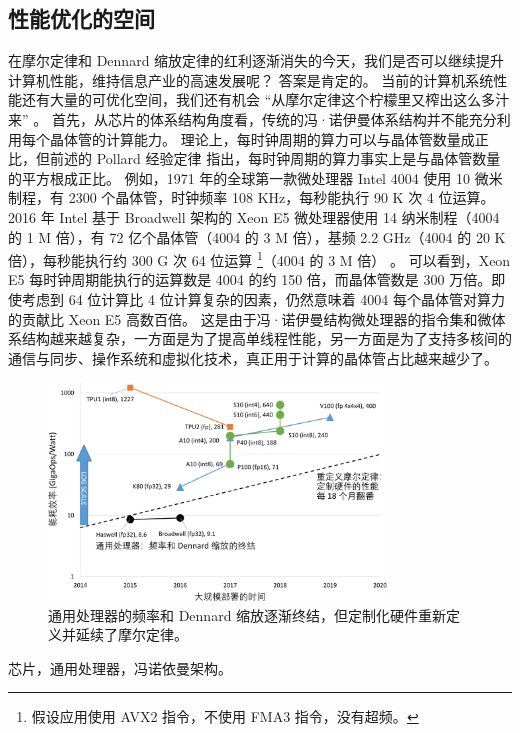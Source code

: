 \subsection{性能优化的空间}

在摩尔定律和 Dennard 缩放定律的红利逐渐消失的今天，我们是否可以继续提升计算机性能，维持信息产业的高速发展呢？
答案是肯定的。
当前的计算机系统性能还有大量的可优化空间，我们还有机会 ``从摩尔定律这个柠檬里又榨出这么多汁来'' \cite{threebody}。
首先，从芯片的体系结构角度看，传统的冯·诺伊曼体系结构并不能充分利用每个晶体管的计算能力。
理论上，每时钟周期的算力可以与晶体管数量成正比，但前述的 Pollard 经验定律 \cite{pollackpollack} 指出，每时钟周期的算力事实上是与晶体管数量的平方根成正比。
例如，1971 年的全球第一款微处理器 Intel 4004 使用 10 微米制程，有 2300 个晶体管，时钟频率 108 KHz，每秒能执行 90 K 次 4 位运算。
2016 年 Intel 基于 Broadwell 架构的 Xeon E5 微处理器使用 14 纳米制程（4004 的 1 M 倍），有 72 亿个晶体管（4004 的 3 M 倍），基频 2.2 GHz（4004 的 20 K 倍），每秒能执行约 300 G 次 64 位运算 \footnote{假设应用使用 AVX2 指令，不使用 FMA3 指令，没有超频。}（4004 的 3 M 倍） \cite{intel-e5-v4}。
可以看到，Xeon E5 每时钟周期能执行的运算数是 4004 的约 150 倍，而晶体管数是 300 万倍。即使考虑到 64 位计算比 4 位计算复杂的因素，仍然意味着 4004 每个晶体管对算力的贡献比 Xeon E5 高数百倍。
这是由于冯·诺伊曼结构微处理器的指令集和微体系结构越来越复杂，一方面是为了提高单线程性能，另一方面是为了支持多核间的通信与同步、操作系统和虚拟化技术，真正用于计算的晶体管占比越来越少了。


\begin{figure}[htbp]
	\centering
	\includegraphics[width=0.8\textwidth]{figures/moores_law_redefined.pdf}
	\caption{通用处理器的频率和 Dennard 缩放逐渐终结，但定制化硬件重新定义并延续了摩尔定律。}
	\label{background:fig:moores_law_redefined}
\end{figure}


芯片，通用处理器，冯诺依曼架构。

